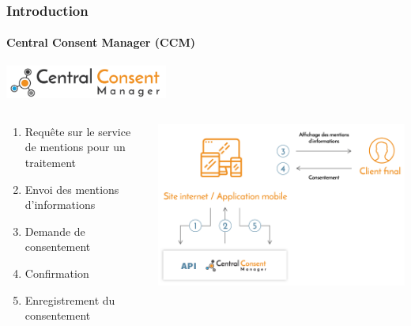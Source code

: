 \documentclass[aspectratio=169]{beamer}
\begin{document}
\begin{frame}
    \frametitle{Introduction}
    \framesubtitle{Central Consent Manager (CCM)}
    \begin{center}
        \includegraphics[width=0.4\textwidth]{ccm_.png}
    \end{center}
    \begin{columns}
        \hfill
        \begin{column}{0.45\textwidth}
            \begin{enumerate}
                \item<1-> Requête sur le service de mentions pour un traitement
                \item<2-> Envoi des mentions d'informations
                \item<3-> Demande de consentement
                \item<4-> Confirmation
                \item<5-> Enregistrement du consentement
            \end{enumerate}
        \end{column}
        \begin{column}{0.5\textwidth}
            \begin{center}
                \includegraphics[width=1.0\textwidth]{ccm.png}
            \end{center}
        \end{column}
    \end{columns}
\end{frame}
\end{document}
